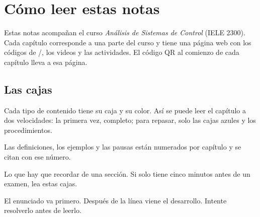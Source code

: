 \chapter*{Cómo leer estas notas}


Estas notas acompañan el curso \emph{Análisis de Sistemas de Control} (IELE 2300). Cada capítulo corresponde a una parte del curso y tiene una página web con los códigos de \matlab/\simulink, los videos y las actividades. El código QR al comienzo de cada capítulo lleva a esa página.

\section*{Las cajas}

Cada tipo de contenido tiene su caja y su color. Así se puede leer el capítulo a dos velocidades: la primera vez, completo; para repasar, solo las cajas azules y los procedimientos.

\begin{definicion}[title={\textcolor{ctrlazul}{\faBookOpen}\hspace{0.45em}Definición 10.2: así se ve una definición}]{}
Las definiciones, los ejemplos y las pausas están numerados por capítulo y se citan con ese número.
\end{definicion}

\begin{ideaclave}
Lo que hay que recordar de una sección. Si solo tiene cinco minutos antes de un examen, lea estas cajas.
\end{ideaclave}

\begin{ejemplo}[title={\textcolor{ctrlvioleta}{\faPencil*}\hspace{0.45em}Ejemplo 10.5: título del ejemplo}]{}
El enunciado va primero.
\solucion Después de la línea viene el desarrollo. Intente resolverlo antes de leerlo.
\end{ejemplo}

